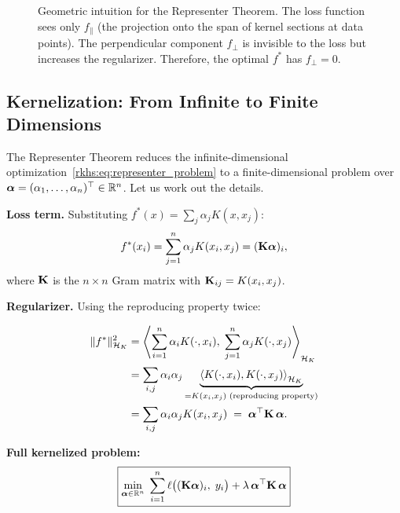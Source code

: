 \begin{notechapter}
\begin{figure}[ht]
\caption{Geometric intuition for the Representer Theorem. The loss
function sees only $f_\parallel$ (the projection onto the span of kernel
sections at data points). The perpendicular component $f_\perp$ is
invisible to the loss but increases the regularizer. Therefore, the
optimal $f^*$ has $f_\perp = 0$.}
\label{rkhs:fig:representer}
\end{figure}

\subsection{Kernelization: From Infinite to Finite Dimensions}

The Representer Theorem reduces the infinite-dimensional
optimization~\eqref{rkhs:eq:representer_problem} to a finite-dimensional
problem over $\boldsymbol{\alpha} = (\alpha_1, \ldots, \alpha_n)^\top \in
\mathbb{R}^n$. Let us work out the details.

\textbf{Loss term.} Substituting $f^*(x) = \sum_j \alpha_j K(x, x_j)$:
\[
f^*(x_i) = \sum_{j=1}^n \alpha_j K(x_i, x_j) = (\mathbf{K}\boldsymbol{\alpha})_i,
\]
where $\mathbf{K}$ is the $n \times n$ Gram matrix with $\mathbf{K}_{ij} =
K(x_i, x_j)$.

\textbf{Regularizer.} Using the reproducing property twice:

\begin{align*}
\| f^* \|_{\mathcal{H}_K}^2 &=
\left\langle \sum_{i=1}^n \alpha_i K(\cdot, x_i),\;
\sum_{j=1}^n \alpha_j K(\cdot, x_j) \right\rangle_{\mathcal{H}_K} \nonumber \\
&= \sum_{i,j} \alpha_i \alpha_j
\underbrace{\left\langle K(\cdot, x_i), K(\cdot, x_j)
\right\rangle_{\mathcal{H}_K}}_{= K(x_i, x_j)
\text{ (reproducing property)}} \nonumber \\
&= \sum_{i,j} \alpha_i \alpha_j K(x_i, x_j) \;=\;
\boldsymbol{\alpha}^\top \mathbf{K}\, \boldsymbol{\alpha}. \label{rkhs:eq:rkhs_norm_alpha}
\end{align*}

\textbf{Full kernelized problem:}
\begin{equation}
\label{rkhs:eq:kernelized}
\boxed{\min_{\boldsymbol{\alpha} \in \mathbb{R}^n}\; \sum_{i=1}^n \ell\bigl((\mathbf{K}\boldsymbol{\alpha})_i,\; y_i\bigr) + \lambda\, \boldsymbol{\alpha}^\top \mathbf{K}\, \boldsymbol{\alpha}}
\end{equation}


\end{notechapter}
